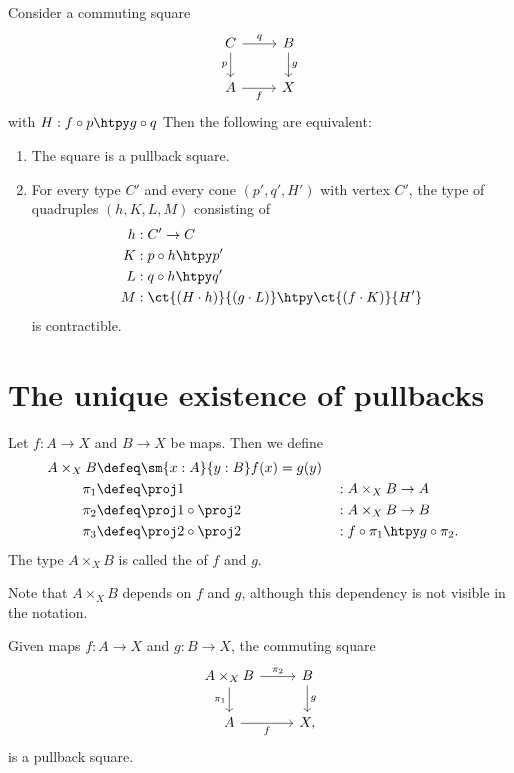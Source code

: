 \begin{thm}\label{lem:pullback_up}
Consider a commuting square
\begin{equation*}
\begin{tikzcd}
C \arrow[r,"q"] \arrow[d,swap,"p"] & B \arrow[d,"g"] \\
A \arrow[r,swap,"f"] & X
\end{tikzcd}
\end{equation*}
with $H:f\circ p\htpy g\circ q$
Then the following are equivalent:
\begin{enumerate}
\item The square is a pullback square.
\item For every type $C'$ and every cone $(p',q',H')$ with vertex $C'$, the type of quadruples $(h,K,L,M)$ consisting of
\begin{align*}
h & : C'\to C \\
K & : p\circ h \htpy p' \\
L & : q\circ h \htpy q' \\
M & : \ct{(H\cdot h)}{(g\cdot L)} \htpy \ct{(f\cdot K)}{H'}
\end{align*}
is contractible.
\end{enumerate}
\end{thm}

\section{The unique existence of pullbacks}

\begin{defn}
Let $f:A\to X$ and $B\to X$ be maps. Then we define
\begin{align*}
A\times_X B & \defeq \sm{x:A}{y:B}f(x)=g(y) \\
\pi_1 & \defeq \proj 1 & & : A\times_X B\to A \\
\pi_2 & \defeq \proj 1\circ\proj 2 & & : A\times_X B\to B\\
\pi_3 & \defeq \proj 2\circ\proj 2 & & : f\circ \pi_1 \htpy g\circ\pi_2.
\end{align*}
The type $A\times_X B$ is called the  of $f$ and $g$.
\end{defn}

Note that $A\times_X B$ depends on $f$ and $g$, although this dependency is not visible in the notation.

\begin{thm}
Given maps $f:A\to X$ and $g:B\to X$, the commuting square
\begin{equation*}
\begin{tikzcd}
A\times_X B \arrow[r,"\pi_2"] \arrow[d,swap,"\pi_1"] & B \arrow[d,"g"] \\
A \arrow[r,swap,"f"] & X,
\end{tikzcd}
\end{equation*}
is a pullback square.
\end{thm}

